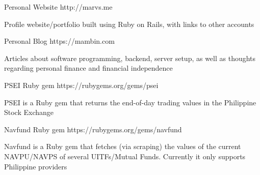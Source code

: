 

\begin{cventries}

  \cventry
    {Personal Website}
    {http://marvs.me}
    {}
    {}
    {
      \begin{cvitems} %
        \item {Profile website/portfolio built using Ruby on Rails, with links to other accounts}
      \end{cvitems}
    }

  \cventry
    {Personal Blog}
    {https://mambin.com}
    {}
    {}
    {
      \begin{cvitems} %
        \item {Articles about software programming, backend, server setup, as well as thoughts regarding personal finance and financial independence}
      \end{cvitems}
    }

  \cventry
    {PSEI Ruby gem}
    {https://rubygems.org/gems/psei}
    {}
    {}
    {
      \begin{cvitems} %
        \item {PSEI is a Ruby gem that returns the end-of-day trading values in the Philippine Stock Exchange}
      \end{cvitems}
    }

  \cventry
    {Navfund Ruby gem}
    {https://rubygems.org/gems/navfund}
    {}
    {}
    {
      \begin{cvitems} %
        \item {Navfund is a Ruby gem that fetches (via scraping) the values of the current NAVPU/NAVPS of several UITFs/Mutual Funds. Currently it only supports Philippine providers}
      \end{cvitems}
    }


\end{cventries}

